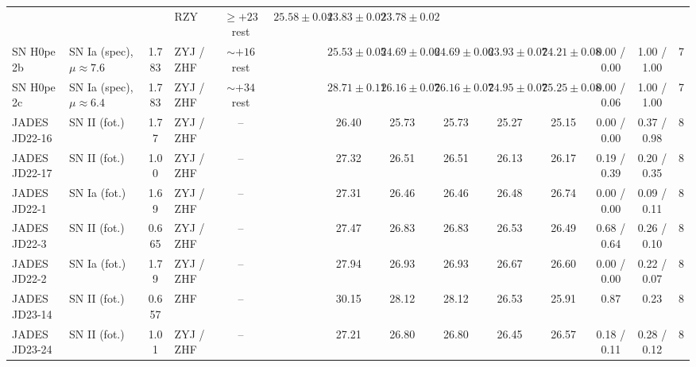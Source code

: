 \begin{table}
{\begin{tabular}{llclcccccccccl}
 & & & RZY\tablenotemark{g} & $\geq+23$ rest\tablenotemark{f} & $25.58\pm0.04$ & $23.83\pm0.02$ & $23.78\pm0.02$ & & & & & & \\[2pt]
SN H0pe 2b & SN Ia (spec), $\mu\approx7.6$ & 1.783 & ZYJ / ZHF\tablenotemark{h} & $\sim+16$ rest\tablenotemark{d} & & $25.53\pm0.05$ & $24.69\pm0.06$ & $24.69\pm0.06$ & $23.93\pm0.07$ & $24.21\pm0.08$ & 0.00 / 0.00 & 1.00 / 1.00 & 7 \\
SN H0pe 2c & SN Ia (spec), $\mu\approx6.4$ & 1.783 & ZYJ / ZHF\tablenotemark{h} & $\sim+34$ rest\tablenotemark{d} & & $28.71\pm0.11$ & $26.16\pm0.07$ & $26.16\pm0.07$ & $24.95\pm0.07$ & $25.25\pm0.08$ & 0.00 / 0.06 & 1.00 / 1.00 & 7 \\
JADES JD22-16 & SN II (fot.) & 1.77 & ZYJ / ZHF & --\tablenotemark{i} & & 26.40 & 25.73 & 25.73 & 25.27 & 25.15 & 0.00 / 0.00 & 0.37 / 0.98 & 8 \\
JADES JD22-17 & SN II (fot.) & 1.00 & ZYJ / ZHF & --\tablenotemark{i} & & 27.32 & 26.51 & 26.51 & 26.13 & 26.17 & 0.19 / 0.39 & 0.20 / 0.35 & 8 \\
JADES JD22-1 & SN Ia (fot.) & 1.69 & ZYJ / ZHF & --\tablenotemark{i} & & 27.31 & 26.46 & 26.46 & 26.48 & 26.74 & 0.00 / 0.00 & 0.09 / 0.11 & 8 \\
JADES JD22-3 & SN II (fot.) & 0.665 & ZYJ / ZHF & --\tablenotemark{i} & & 27.47 & 26.83 & 26.83 & 26.53 & 26.49 & 0.68 / 0.64 & 0.26 / 0.10 & 8 \\
JADES JD22-2 & SN Ia (fot.) & 1.79 & ZYJ / ZHF & --\tablenotemark{i} & & 27.94 & 26.93 & 26.93 & 26.67 & 26.60 & 0.00 / 0.00 & 0.22 / 0.07 & 8 \\
JADES JD23-14 & SN II (fot.) & 0.657 & ZHF\tablenotemark{j} & --\tablenotemark{i} & & 30.15 & 28.12 & 28.12 & 26.53 & 25.91 & 0.87 & 0.23 & 8 \\
JADES JD23-24 & SN II (fot.) & 1.01 & ZYJ / ZHF & --\tablenotemark{i} & & 27.21 & 26.80 & 26.80 & 26.45 & 26.57 & 0.18 / 0.11 & 0.28 / 0.12 & 8 \\
\hline
\end{tabular}}
\end{table}
